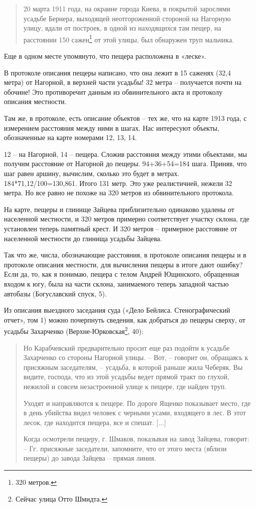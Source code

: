 \begin{quotation} 
20 марта 1911 года, на окраине города Киева, в покрытой зарослями усадьбе Бернера, выходящей  неотгороженной стороной на Нагорную улицу, вдали от построек, в одной из находящихся там пещер, на расстоянии 150 сажен\footnote{320 метров.} от этой улицы, был обнаружен труп мальчика.
\end{quotation} 

Еще в одном месте упомянуто, что пещера расположена в «леске».

В протоколе описания пещеры написано, что она лежит в 15 саженях (32,4 метра) от Нагорной, в верхней части усадьбы! 32 метра – получается почти на обочине! Это противоречит данным из обвинительного акта и протоколу описания местности.

Там же, в протоколе, есть описание объектов – тех же, что на карте 1913 года, с измерением расстояния между ними в шагах. Нас интересуют объекты, обозначенные на карте номерами 12, 13, 14.

12 – на Нагорной, 14 – пещера. Сложив расстояния между этими объектами, мы получим расстояние от Нагорной до пещеры. 94+36+54=184 шага. Приняв, что шаг равен аршину, вычислим, сколько это будет в метрах. 184*71,12/100=130,861. Итого 131 метр. Это уже реалистичней, нежели 32 метра. Но все равно не похоже на 320 метров из обвинительного протокола. 

На карте, пещеры и глинище Зайцева приблизительно одинаково удалены от населенной местности, и 320 метров примерно соответствует участку склона, где установлен теперь памятный крест. И 320 метров – примерное расстояние от населенной местности до глинища усадьбы Зайцева. 

Так что же, числа, обозначающие расстояния, в протоколе описания пещеры и в протоколе описания местности, для вычисления пещеры в итоге дают ошибку? Если да, то, как я понимаю, пещера с телом Андрей Ющинского, обращенная входом к югу, была на части склона, занимаемого теперь западной частью автобазы (Богуславский спуск, 5). 

Из описания выездного заседания суда («Дело Бейлиса. Стенографический отчет», том 1) можно почерпнуть сведения, как добраться до пещеры сверху, от усадьбы Захарченко (Верхне-Юрковская\footnote{Сейчас улица Отто Шмидта.}, 40):

\begin{quotation}
Но Карабчевский предварительно просит еще раз подойти к усадьбе Захарченко со стороны Нагорной улицы.
 – Вот, – говорит он, обращаясь к присяжным заседателям, – усадьба, в которой раньше жила Чеберяк. Вы видите, господа, что из этой усадьбы ведет прямой тракт по глухой, нежилой и совсем незастроенной улице к пещере, где найден труп.

Уходят и направляются к пещере. По дороге Ященко показывает место, где в день убийства видел человек с черными усами, входящего в лес. В этот лесок, где находится пещера, все и спешат. [...]

Когда осмотрели пещеру, г. Шмаков, показывая на завод Зайцева, говорит:
 – Гг. присяжные заседатели, запомните, что от этого места (вблизи пещеры) до завода Зайцева – прямая линия.
\end{quotation}

